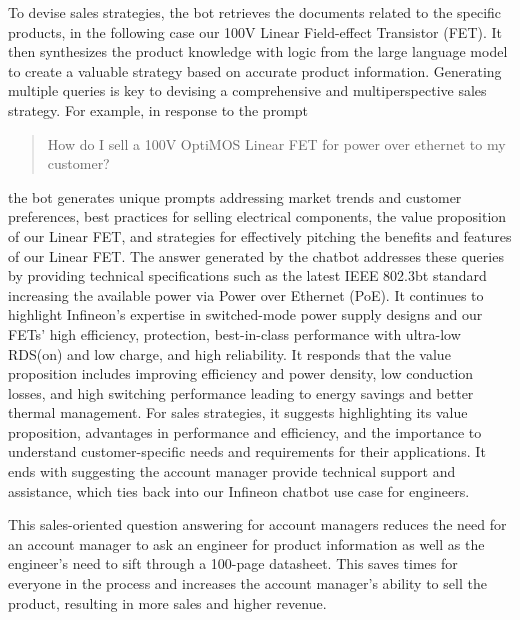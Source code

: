 \documentclass{article}
\begin{document}
To devise sales strategies, the bot retrieves the documents related to the specific products, in the following case our 100V Linear Field-effect Transistor (FET). It then synthesizes the product knowledge with logic from the large language model to create a valuable strategy based on accurate product information. Generating multiple queries is key to devising a comprehensive and multiperspective sales strategy. For example, in response to the prompt \begin{quote} How do I sell a 100V OptiMOS Linear FET for power over ethernet to my customer? \end{quote} the bot generates unique prompts addressing market trends and customer preferences, best practices for selling electrical components, the value proposition of our Linear FET, and strategies for effectively pitching the benefits and features of our Linear FET. The answer generated by the chatbot addresses these queries by providing technical specifications such as the latest IEEE 802.3bt standard increasing the available power via Power over Ethernet (PoE). It continues to highlight Infineon's expertise in switched-mode power supply designs and our FETs' high efficiency, protection, best-in-class performance with ultra-low RDS(on) and low charge, and high reliability. It responds that the value proposition includes improving efficiency and power density, low conduction losses, and high switching performance leading to energy savings and better thermal management. For sales strategies, it suggests highlighting its value proposition, advantages in performance and efficiency, and the importance to understand customer-specific needs and requirements for their applications. It ends with suggesting the account manager provide technical support and assistance, which ties back into our Infineon chatbot use case for engineers.

This sales-oriented question answering for account managers reduces the need for an account manager to ask an engineer for product information as well as the engineer's need to sift through a 100-page datasheet. This saves times for everyone in the process and increases the account manager's ability to sell the product, resulting in more sales and higher revenue.
\end{document}

